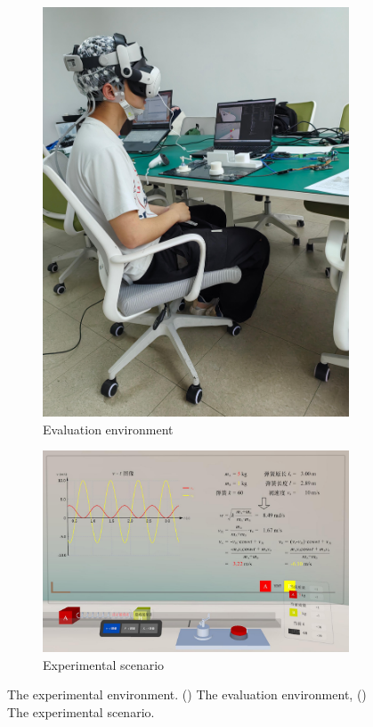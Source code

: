\documentclass[runningheads]{llncs}
\begin{document}
\begin{figure}
 \begin{subfigure}{0.32\linewidth}
  \centering
  \includegraphics[width=\linewidth]{image/experiment-environment.pdf}
  \caption{Evaluation environment}
  \label{fig:experimental-introduction}
 \end{subfigure}
 \hfill
 \begin{subfigure}{0.64\linewidth}
  \centering
  \includegraphics[width=\linewidth]{image/experiment-scenario.pdf}
  \caption{Experimental scenario}
  \label{fig:experimental-operation}
 \end{subfigure}
 \caption{The experimental environment. () The evaluation environment, () The experimental scenario.}
 \label{fig:experimental-show}
\end{figure}
\end{document}
